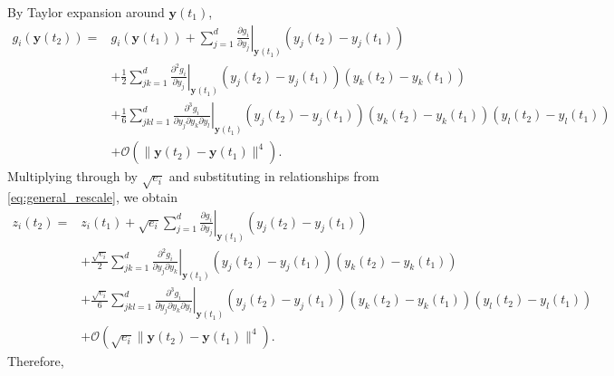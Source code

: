 By Taylor expansion around $\mathbf{y}(t_1)$,
%
\begin{equation}
\begin{aligned}
g_i(\mathbf{y}(t_2)) =& 
g_i(\mathbf{y}(t_1)) + \sum_{j=1}^d \left. \frac{\partial g_i}{\partial y_j} \right|_{\mathbf{y}(t_1)} (y_j(t_2)-y_j(t_1))\\
&+ \frac{1}{2} \sum_{jk=1}^d \left. \frac{\partial^2 g_i}{\partial y_j} \right|_{\mathbf{y}(t_1)} (y_j(t_2)-y_j(t_1)) (y_k(t_2)-y_k(t_1))\\
&+ \frac{1}{6} \sum_{jkl=1}^d \left. \frac{\partial^3 g_i}{\partial y_j \partial y_k \partial y_l} \right|_{\mathbf{y}(t_1)} (y_j(t_2)-y_j(t_1)) (y_k(t_2)-y_k(t_1)) (y_l(t_2)-y_l(t_1)) \\
&+ \mathcal{O}( \|\mathbf{y}(t_2) - \mathbf{y}(t_1) \|^4) .
\end{aligned}
\end{equation}
%
Multiplying through by $\sqrt{e_i}$ and
substituting in relationships from \eqref{eq:general_rescale}, we obtain
%
\begin{equation}
\begin{aligned}
z_i(t_2) =& 
z_i(t_1) + \sqrt{e_i} \sum_{j=1}^d \left. \frac{\partial g_i}{\partial y_j} \right|_{\mathbf{y}(t_1)} (y_j(t_2)-y_j(t_1))\\
&+ \frac{\sqrt{e_i}}{2} \sum_{jk=1}^d \left. \frac{\partial^2 g_i}{\partial y_j \partial y_k} \right|_{\mathbf{y}(t_1)} (y_j(t_2)-y_j(t_1)) (y_k(t_2)-y_k(t_1))\\
&+ \frac{\sqrt{e_i}}{6} \sum_{jkl=1}^d \left. \frac{\partial^3 g_i}{\partial y_j \partial y_k \partial y_l} \right|_{\mathbf{y}(t_1)} (y_j(t_2)-y_j(t_1)) (y_k(t_2)-y_k(t_1)) (y_l(t_2)-y_l(t_1)) \\
&+ \mathcal{O}( \sqrt{e_i} \|\mathbf{y}(t_2) - \mathbf{y}(t_1) \|^4) .
\end{aligned}
\end{equation}
%
Therefore, 
%

